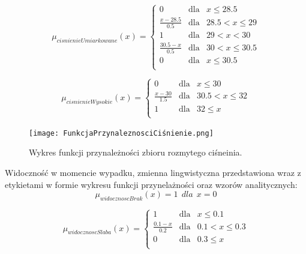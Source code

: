 \documentclass{classrep}
\begin{document}
\begin{equation}
\mu _{cisnienieUmiarkowane}(x) =  \left\{ \begin{array}{rcl}
 0 & \mbox{dla} & x  \leq 28.5 \\
\frac{x - 28.5}{0.5} & \mbox{dla} & 28.5 < x \leq 29\\
1 & \mbox{dla} & 29 < x < 30\\
\frac{30.5 - x}{0.5} & \mbox{dla} & 30 < x \leq 30.5\\
 0 & \mbox{dla} & x  \leq 30.5 \\
\end{array}\right.
\end{equation}

\begin{equation}
\mu _{cisnienieWysokie}(x) =  \left\{ \begin{array}{rcl}
 0 & \mbox{dla} & x \leq 30 \\
\frac{x - 30}{1.5} & \mbox{dla} & 30.5 < x \leq 32\\
1 & \mbox{dla} & 32 \leq x\\
\end{array}\right.
\end{equation}

\begin{figure}[h!]
 \centering
 \texttt{[image: FunkcjaPrzynaleznosciCiśnienie.png]}
 \vspace{-0.3cm}
 \caption{Wykres funkcji przynależności zbioru rozmytego ciśneinia. }
 \label{rysunek do eksperymentu 1 wariantu 1}
\end{figure}
\newpage



Widoczność w momencie wypadku, zmienna lingwistyczna przedstawiona wraz z etykietami w formie wykresu funkcji przynelażności oraz wzorów analitycznych:
\begin{equation}
\mu _{widocznoscBrak}(x) =   1 \ \ dla \ \ x  = 0
\end{equation}

\begin{equation}
\mu _{widocznoscSlaba}(x) =  \left\{ \begin{array}{rcl}
 1 & \mbox{dla} & x  \leq 0.1 \\
\frac{0.1 - x}{0.2} & \mbox{dla} & 0.1 < x \leq 0.3\\
0 & \mbox{dla} & 0.3 \leq x\\
\end{array}\right.
\end{equation}
\end{document}
